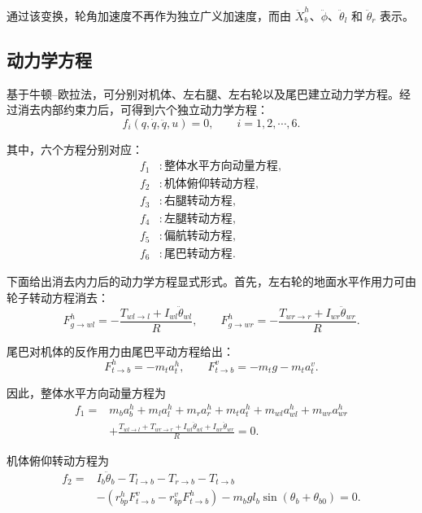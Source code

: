 \documentclass[UTF8,a4paper,12pt]{ctexart}
\begin{document}
通过该变换，轮角加速度不再作为独立广义加速度，而由 $\ddot X_b^h$、$\ddot\phi$、$\ddot\theta_l$ 和 $\ddot\theta_r$ 表示。

\subsection{动力学方程}

基于牛顿--欧拉法，可分别对机体、左右腿、左右轮以及尾巴建立动力学方程。经过消去内部约束力后，可得到六个独立动力学方程：
\begin{equation}
    f_i(q,\dot q,\ddot q,u) = 0,
    \qquad i = 1,2,\cdots,6.
\end{equation}

其中，六个方程分别对应：
\begin{align}
    f_1 &: \text{整体水平方向动量方程}, \\
    f_2 &: \text{机体俯仰转动方程}, \\
    f_3 &: \text{右腿转动方程}, \\
    f_4 &: \text{左腿转动方程}, \\
    f_5 &: \text{偏航转动方程}, \\
    f_6 &: \text{尾巴转动方程}.
\end{align}

下面给出消去内力后的动力学方程显式形式。首先，左右轮的地面水平作用力可由轮子转动方程消去：
\begin{equation}
    F_{g\to wl}^h
    =
    -\frac{T_{wl\to l}+I_{wl}\ddot\theta_{wl}}{R},
    \qquad
    F_{g\to wr}^h
    =
    -\frac{T_{wr\to r}+I_{wr}\ddot\theta_{wr}}{R}.
\end{equation}

尾巴对机体的反作用力由尾巴平动方程给出：
\begin{equation}
    F_{t\to b}^h = -m_t a_t^h,
    \qquad
    F_{t\to b}^v = -m_t g - m_t a_t^v.
\end{equation}

因此，整体水平方向动量方程为
\begin{equation}
\begin{aligned}
    f_1
    ={}&
    m_b a_b^h
    + m_l a_l^h
    + m_r a_r^h
    + m_t a_t^h
    + m_{wl} a_{wl}^h
    + m_{wr} a_{wr}^h  \\
    &+
    \frac{
        T_{wl\to l}
        + T_{wr\to r}
        + I_{wl}\ddot\theta_{wl}
        + I_{wr}\ddot\theta_{wr}
    }{R}
    =0 .
\end{aligned}
\end{equation}

机体俯仰转动方程为
\begin{equation}
\begin{aligned}
    f_2
    ={}&
    I_b\ddot\theta_b
    - T_{l\to b}
    - T_{r\to b}
    - T_{t\to b}  \\
    &-
    \left(
        r_{bp}^h F_{t\to b}^v
        -
        r_{bp}^v F_{t\to b}^h
    \right)
    -
    m_b g l_b \sin(\theta_b+\theta_{b0})
    =0 .
\end{aligned}
\end{equation}
\end{document}
